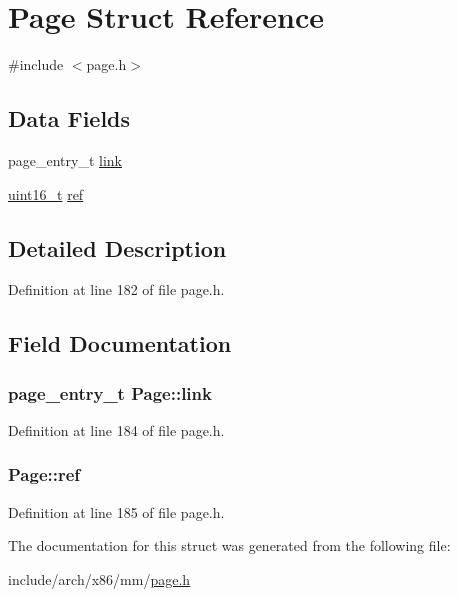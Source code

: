 \hypertarget{structPage}{\section{\-Page \-Struct \-Reference}
\label{structPage}
}


{\ttfamily \#include $<$page.\-h$>$}

\subsection*{\-Data \-Fields}
\begin{DoxyCompactItemize}
\item 
page\-\_\-entry\-\_\-t \hyperlink{structPage_aaeb5bed950eadcf101339c1e8a426f4e}{link}
\item 
\hyperlink{types_8h_a273cf69d639a59973b6019625df33e30}{uint16\-\_\-t} \hyperlink{structPage_af1374e60f63e1e0aaa6055e2c00c806f}{ref}
\end{DoxyCompactItemize}


\subsection{\-Detailed \-Description}


\-Definition at line 182 of file page.\-h.



\subsection{\-Field \-Documentation}
\hypertarget{structPage_aaeb5bed950eadcf101339c1e8a426f4e}{
\subsubsection[{link}]{\setlength{\rightskip}{0pt plus 5cm}page\-\_\-entry\-\_\-t {\bf \-Page\-::link}}}\label{structPage_aaeb5bed950eadcf101339c1e8a426f4e}


\-Definition at line 184 of file page.\-h.

\hypertarget{structPage_af1374e60f63e1e0aaa6055e2c00c806f}{
\subsubsection[{ref}]{ {\bf \-Page\-::ref}}}\label{structPage_af1374e60f63e1e0aaa6055e2c00c806f}


\-Definition at line 185 of file page.\-h.



\-The documentation for this struct was generated from the following file\-:\begin{DoxyCompactItemize}
\item 
include/arch/x86/mm/\hyperlink{page_8h}{page.\-h}\end{DoxyCompactItemize}
